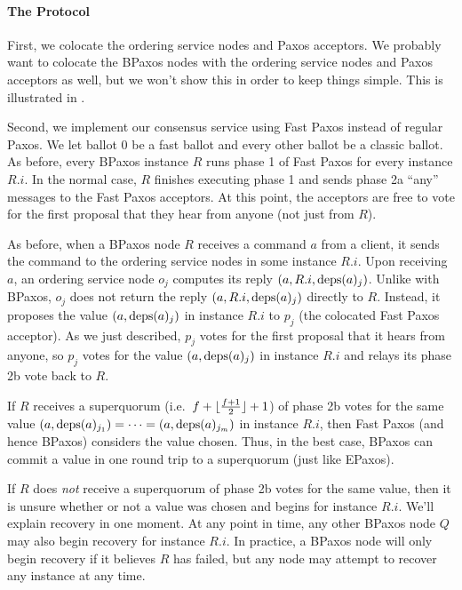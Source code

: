 \documentclass{mwhittaker}
\begin{document}
\paragraph{The Protocol}
First, we colocate the ordering service nodes and Paxos acceptors. We probably
want to colocate the BPaxos nodes with the ordering service nodes and Paxos
acceptors as well, but we won't show this in order to keep things simple. This
is illustrated in .

{}

Second, we implement our consensus service using Fast Paxos instead of regular
Paxos. We let ballot $0$ be a fast ballot and every other ballot be a classic
ballot. As before, every BPaxos instance $R$ runs phase 1 of Fast Paxos for
every instance $R.i$. In the normal case, $R$ finishes executing phase 1 and
sends phase 2a ``any'' messages to the Fast Paxos acceptors. At this point, the
acceptors are free to vote for the first proposal that they hear from anyone
(not just from $R$).

As before, when a BPaxos node $R$ receives a command $a$ from a client, it
sends the command to the ordering service nodes in some instance $R.i$. Upon
receiving $a$, an ordering service node $o_j$ computes its reply $(a, R.i,
\text{deps}(a)_j)$. Unlike with BPaxos, $o_j$ does not return the reply $(a, R.i,
\text{deps}(a)_j)$ directly to $R$. Instead, it proposes the value $(a, \text{deps}(a)_j)$
in instance $R.i$ to $p_j$ (the colocated Fast Paxos acceptor). As we just
described, $p_j$ votes for the first proposal that it hears from anyone, so
$p_j$ votes for the value $(a, \text{deps}(a)_j)$ in instance $R.i$ and relays its
phase 2b vote back to $R$.

If $R$ receives a superquorum (i.e.\ $f + \lfloor\frac{f+1}{2}\rfloor + 1$) of phase
2b votes for the same value $(a, \text{deps}(a)_{j_1}) = \cdots = (a,
\text{deps}(a)_{j_{m}})$ in instance $R.i$, then Fast Paxos (and hence BPaxos)
considers the value chosen. Thus, in the best case, BPaxos can commit a value
in one round trip to a superquorum (just like EPaxos).

If $R$ does \emph{not} receive a superquorum of phase 2b votes for the same
value, then it is unsure whether or not a value was chosen and begins
 for instance $R.i$. We'll explain recovery in one moment. At
any point in time, any other BPaxos node $Q$ may also begin recovery for
instance $R.i$. In practice, a BPaxos node will only begin recovery if it
believes $R$ has failed, but any node may attempt to recover any instance at
any time.
\end{document}
